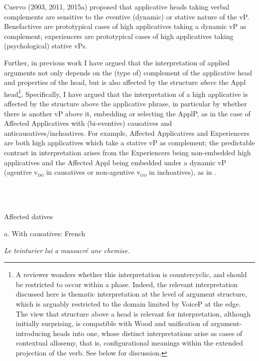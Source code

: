 \documentclass[output=paper,modfonts,nonflat]{langsci/langscibook}
\begin{document}
Cuervo (2003, 2011, 2015a) proposed that applicative heads taking verbal complements are sensitive to the eventive (dynamic) or stative nature of the vP. Benefactives are prototypical cases of high applicatives taking a dynamic vP as complement; experiencers are prototypical cases of high applicatives taking (psychological) stative vPs. 

Further, in previous work I have argued that the interpretation of applied arguments not only depends on the (type of) complement of the applicative head and properties of the head, but is also affected by the structure \textit{above} the Appl head\footnote{A reviewer wonders whether this interpretation is countercyclic, and should be restricted to occur within a phase. Indeed, the relevant interpretation discussed here is thematic interpretation at the level of argument structure, which is arguably restricted to the domain limited by VoiceP at the edge. The view that structure above a head is relevant for interpretation, although initially surprising, is compatible with Wood and  unification of argument-introducing heads into one, whose distinct interpretations arise as cases of contextual allosemy, that is, configurational meanings within the extended projection of the verb. See below for discussion.}. Specifically, I have argued that the interpretation of a high applicative is affected by the structure above the applicative phrase, in particular by whether there is another vP above it, embedding or selecting the ApplP, as in the case of Affected Applicatives with (bi-eventive) causatives and anticausatives/inchoatives. For example, Affected Applicatives  and Experiencers  are both high applicatives which take a stative vP as complement; the predictable contrast in interpretation arises from the Experiencers being non-embedded high applicatives  and the Affected Appl being embedded under a dynamic vP (agentive v\textsc{\textsubscript{do}} in causatives or non-agentive v\textsc{\textsubscript{go}} in inchoatives), as in .

\ea%
    \label{ex:key:3}
    \gll\\
        \\
    \glt
    \z

           Affected datives 

a. With causatives: French  

  \textit{Le} \textit{teinturier} \textit{lui} \textit{a} \textit{massacré} \textit{une} \textit{chemise.} 
\end{document}
